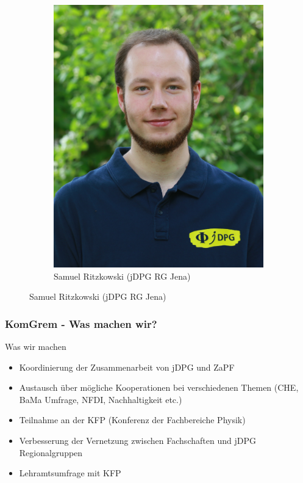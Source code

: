 \documentclass[compress, aspectratio=169]{beamer}
\begin{document}
\begin{frame}
\begin{figure}
\begin{subfigure}[t]{0.24\textwidth}
                \includegraphics[height=0.5\textheight]{samuel.jpg}
                \caption*{Samuel Ritzkowski (jDPG RG Jena)}
        \end{subfigure}
 \end{figure}
\end{frame}

\begin{frame}\frametitle{KomGrem - Was machen wir?}
    \begin{block}{Was wir machen}
        \begin{itemize}
            \item Koordinierung der Zusammenarbeit von jDPG und ZaPF
            \item Austausch über mögliche Kooperationen bei verschiedenen Themen (CHE, BaMa Umfrage, NFDI, Nachhaltigkeit etc.)
            \item Teilnahme an der KFP (Konferenz der Fachbereiche Physik)
            \item Verbesserung der Vernetzung zwischen Fachschaften und jDPG Regionalgruppen
            \item Lehramtsumfrage mit KFP
        \end{itemize}
    \end{block}
\end{frame}
\end{document}
